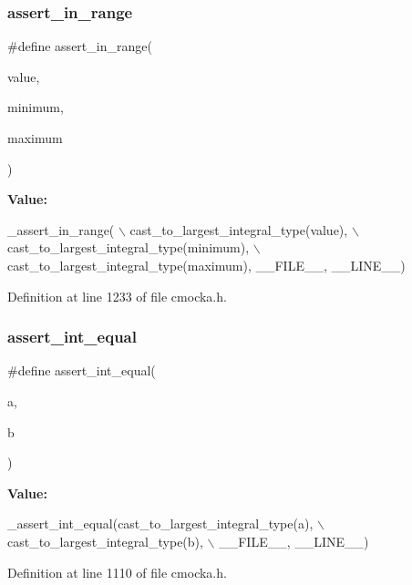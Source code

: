 \subsubsection{\texorpdfstring{assert\+\_\+in\+\_\+range}{assert\_in\_range}}
{\footnotesize\ttfamily \#define assert\+\_\+in\+\_\+range(\begin{DoxyParamCaption}\item[{}]{value,  }\item[{}]{minimum,  }\item[{}]{maximum }\end{DoxyParamCaption})}

{\bfseries Value\+:}
\begin{DoxyCode}
\_assert\_in\_range( \(\backslash\)
        cast\_to\_largest\_integral\_type(value), \(\backslash\)
        cast\_to\_largest\_integral\_type(minimum), \(\backslash\)
        cast\_to\_largest\_integral\_type(maximum), \_\_FILE\_\_, \_\_LINE\_\_)
\end{DoxyCode}


Definition at line 1233 of file cmocka.\+h.

\mbox{\label{group__cmocka__asserts_gac31995a6393c6aef66d60b3850fc5f4d}} 
\subsubsection{\texorpdfstring{assert\+\_\+int\+\_\+equal}{assert\_int\_equal}}
{\footnotesize\ttfamily \#define assert\+\_\+int\+\_\+equal(\begin{DoxyParamCaption}\item[{}]{a,  }\item[{}]{b }\end{DoxyParamCaption})}

{\bfseries Value\+:}
\begin{DoxyCode}
\_assert\_int\_equal(cast\_to\_largest\_integral\_type(a), \(\backslash\)
                      cast\_to\_largest\_integral\_type(b), \(\backslash\)
                      \_\_FILE\_\_, \_\_LINE\_\_)
\end{DoxyCode}


Definition at line 1110 of file cmocka.\+h.

\mbox{\label{group__cmocka__asserts_ga231fbb3638491f77825f3bbf68d5eb59}} 
